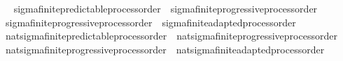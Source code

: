 \begin{isabellebody}
\isadelimproof
\ %
\endisadelimproof
%
\isatagproof
\isacommand{{\isachardot}{\kern0pt}{\isachardot}{\kern0pt}}\isamarkupfalse%
%
\endisatagproof
{\isafoldproof}%
%
\isadelimproof
%
\endisadelimproof
\isanewline
\isanewline
\isanewline
\isanewline
{}\isamarkupfalse%
\ sigma{\isacharunderscore}{\kern0pt}finite{\isacharunderscore}{\kern0pt}predictable{\isacharunderscore}{\kern0pt}process{\isacharunderscore}{\kern0pt}order\ {\isasymsubseteq}\ sigma{\isacharunderscore}{\kern0pt}finite{\isacharunderscore}{\kern0pt}progressive{\isacharunderscore}{\kern0pt}process{\isacharunderscore}{\kern0pt}order%
\isadelimproof
\ %
\endisadelimproof
%
\isatagproof
\isacommand{{\isachardot}{\kern0pt}{\isachardot}{\kern0pt}}\isamarkupfalse%
%
\endisatagproof
{\isafoldproof}%
%
\isadelimproof
%
\endisadelimproof
\isanewline
{}\isamarkupfalse%
\ sigma{\isacharunderscore}{\kern0pt}finite{\isacharunderscore}{\kern0pt}progressive{\isacharunderscore}{\kern0pt}process{\isacharunderscore}{\kern0pt}order\ {\isasymsubseteq}\ sigma{\isacharunderscore}{\kern0pt}finite{\isacharunderscore}{\kern0pt}adapted{\isacharunderscore}{\kern0pt}process{\isacharunderscore}{\kern0pt}order%
\isadelimproof
\ %
\endisadelimproof
%
\isatagproof
\isacommand{{\isachardot}{\kern0pt}{\isachardot}{\kern0pt}}\isamarkupfalse%
%
\endisatagproof
{\isafoldproof}%
%
\isadelimproof
%
\endisadelimproof
\ \isanewline
\isanewline
{}\isamarkupfalse%
\ nat{\isacharunderscore}{\kern0pt}sigma{\isacharunderscore}{\kern0pt}finite{\isacharunderscore}{\kern0pt}predictable{\isacharunderscore}{\kern0pt}process{\isacharunderscore}{\kern0pt}order\ {\isasymsubseteq}\ nat{\isacharunderscore}{\kern0pt}sigma{\isacharunderscore}{\kern0pt}finite{\isacharunderscore}{\kern0pt}progressive{\isacharunderscore}{\kern0pt}process{\isacharunderscore}{\kern0pt}order%
\isadelimproof
\ %
\endisadelimproof
%
\isatagproof
\isacommand{{\isachardot}{\kern0pt}{\isachardot}{\kern0pt}}\isamarkupfalse%
%
\endisatagproof
{\isafoldproof}%
%
\isadelimproof
%
\endisadelimproof
\isanewline
{}\isamarkupfalse%
\ nat{\isacharunderscore}{\kern0pt}sigma{\isacharunderscore}{\kern0pt}finite{\isacharunderscore}{\kern0pt}progressive{\isacharunderscore}{\kern0pt}process{\isacharunderscore}{\kern0pt}order\ {\isasymsubseteq}\ nat{\isacharunderscore}{\kern0pt}sigma{\isacharunderscore}{\kern0pt}finite{\isacharunderscore}{\kern0pt}adapted{\isacharunderscore}{\kern0pt}process{\isacharunderscore}{\kern0pt}order%
\isadelimproof
\ %
\endisadelimproof
%
\isatagproof
\isacommand{{\isachardot}{\kern0pt}{\isachardot}{\kern0pt}}\isamarkupfalse%

\end{isabellebody}
